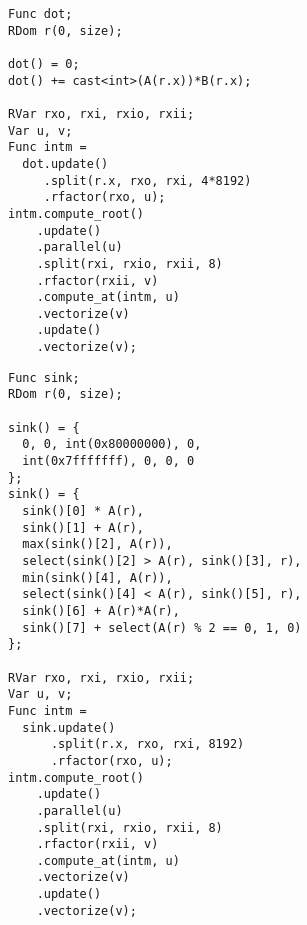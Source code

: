 \begin{minipage}{\linewidth}
\begin{lstlisting}[caption={Dot product}, label={lst:benchmark_dot_product}]
Func dot;
RDom r(0, size);

dot() = 0;
dot() += cast<int>(A(r.x))*B(r.x);

RVar rxo, rxi, rxio, rxii;
Var u, v;
Func intm =
  dot.update()
     .split(r.x, rxo, rxi, 4*8192)
     .rfactor(rxo, u);
intm.compute_root()
    .update()
    .parallel(u)
    .split(rxi, rxio, rxii, 8)
    .rfactor(rxii, v)
    .compute_at(intm, u)
    .vectorize(v)
    .update()
    .vectorize(v);
\end{lstlisting}
\end{minipage}

\begin{lstlisting}[caption={Everything but the kitchen sink.}, label={lst:benchmark_kitchen_sink}]
Func sink;
RDom r(0, size);

sink() = {
  0, 0, int(0x80000000), 0,
  int(0x7fffffff), 0, 0, 0
};
sink() = {
  sink()[0] * A(r),
  sink()[1] + A(r),
  max(sink()[2], A(r)),
  select(sink()[2] > A(r), sink()[3], r),
  min(sink()[4], A(r)),
  select(sink()[4] < A(r), sink()[5], r),
  sink()[6] + A(r)*A(r),
  sink()[7] + select(A(r) % 2 == 0, 1, 0)
};

RVar rxo, rxi, rxio, rxii;
Var u, v;
Func intm =
  sink.update()
      .split(r.x, rxo, rxi, 8192)
      .rfactor(rxo, u);
intm.compute_root()
    .update()
    .parallel(u)
    .split(rxi, rxio, rxii, 8)
    .rfactor(rxii, v)
    .compute_at(intm, u)
    .vectorize(v)
    .update()
    .vectorize(v);
\end{lstlisting}
